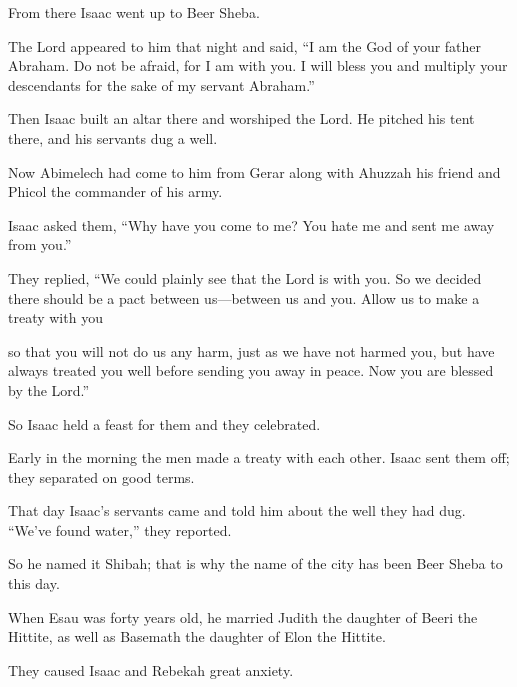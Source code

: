 \begin{scripture}
 From there Isaac went up to Beer Sheba.
 The Lord appeared to him that night and said, ``I am the God of your father Abraham. Do not be afraid, for I am with you. I will bless you and multiply your descendants for the sake of my servant Abraham.''
 Then Isaac built an altar there and worshiped the Lord. He pitched his tent there, and his servants dug a well.
\everypar{}

 Now Abimelech had come to him from Gerar along with Ahuzzah his friend and Phicol the commander of his army.
 Isaac asked them, ``Why have you come to me? You hate me and sent me away from you.''
 They replied, ``We could plainly see that the Lord is with you. So we decided there should be a pact between us---between us and you. Allow us to make a treaty with you
 so that you will not do us any harm, just as we have not harmed you, but have always treated you well before sending you away in peace. Now you are blessed by the Lord.''
\everypar{}

 So Isaac held a feast for them and they celebrated.
 Early in the morning the men made a treaty with each other. Isaac sent them off; they separated on good terms.
\everypar{}

 That day Isaac's servants came and told him about the well they had dug. ``We've found water,'' they reported.
 So he named it Shibah; that is why the name of the city has been Beer Sheba to this day.
\everypar{}

 When Esau was forty years old, he married Judith the daughter of Beeri the Hittite, as well as Basemath the daughter of Elon the Hittite.
 They caused Isaac and Rebekah great anxiety.


\end{scripture}
